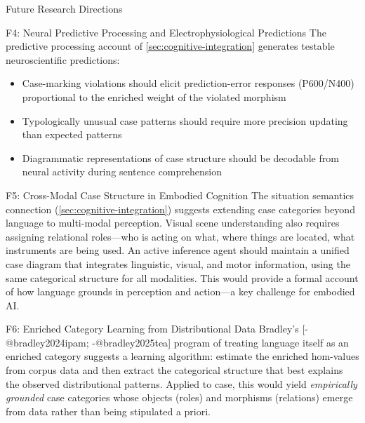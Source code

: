 \documentclass[
  ignorenonframetext,
]{beamer}
\providecommand{\tightlist}{%
  \setlength{\itemsep}{0pt}\setlength{\parskip}{0pt}}
\begin{document}
\begin{frame}{Future Research Directions}
\begin{block}{F4: Neural Predictive Processing and Electrophysiological
Predictions}
\protect{}\label{f4-neural-predictive-processing-and-electrophysiological-predictions}
The predictive processing account of \autoref{sec:cognitive-integration}
generates testable neuroscientific predictions:

\begin{itemize}
\tightlist
\item
  Case-marking violations should elicit prediction-error responses
  (P600/N400) proportional to the enriched weight of the violated
  morphism
\item
  Typologically unusual case patterns should require more precision
  updating than expected patterns
\item
  Diagrammatic representations of case structure should be decodable
  from neural activity during sentence comprehension
\end{itemize}
\end{block}

\begin{block}{F5: Cross-Modal Case Structure in Embodied Cognition}
\protect{}\label{f5-cross-modal-case-structure-in-embodied-cognition}
The situation semantics connection (\autoref{sec:cognitive-integration})
suggests extending case categories beyond language to multi-modal
perception. Visual scene understanding also requires assigning
relational roles---who is acting on what, where things are located, what
instruments are being used. An active inference agent should maintain a
unified case diagram that integrates linguistic, visual, and motor
information, using the same categorical structure for all modalities.
This would provide a formal account of how language grounds in
perception and action---a key challenge for embodied AI.
\end{block}

\begin{block}{F6: Enriched Category Learning from Distributional Data}
\protect{}\label{f6-enriched-category-learning-from-distributional-data}
Bradley's {[}-@bradley2024ipam; -@bradley2025tea{]} program of treating
language itself as an enriched category suggests a learning algorithm:
estimate the enriched hom-values from corpus data and then extract the
categorical structure that best explains the observed distributional
patterns. Applied to case, this would yield \emph{empirically grounded}
case categories whose objects (roles) and morphisms (relations) emerge
from data rather than being stipulated a priori.
\end{block}


\end{frame}
\end{document}
